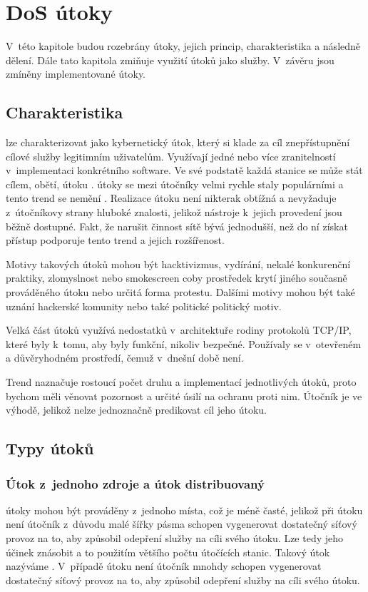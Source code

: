 \chapter[DoS útoky]{DoS útoky}
V~této kapitole budou rozebrány  útoky, jejich princip, charakteristika a následně
dělení. Dále tato kapitola zmiňuje využití  útoků jako služby. V~závěru jsou
zmíněny implementované útoky.

\section{Charakteristika}
 lze charakterizovat jako kybernetický útok, který si klade za cíl znepřístupnění
 cílové služby legitimním uživatelům. Využívají jedné nebo více zranitelností v~implementaci
 konkrétního software. Ve své podstatě každá stanice se může stát cílem, obětí, útoku
 .  útoky se mezi útočníky velmi rychle staly populárními a tento trend
 se nemění \cite{akamai_q2_2017}. Realizace  útoku není nikterak obtížná a
 nevyžaduje z~útočníkovy strany hluboké znalosti, jelikož nástroje k~jejich provedení jsou
 běžně dostupné. %
 Fakt, že narušit činnost sítě bývá
 jednodušší, než do ní získat přístup podporuje tento trend a jejich rozšířenost. 

Motivy takových útoků mohou být hacktivizmus, vydírání, nekalé konkurenční praktiky,
zlomyslnost nebo smokescreen coby prostředek krytí jiného současně prováděného útoku nebo
určitá forma protestu. Dalšími motivy mohou být také uznání hackerské komunity nebo také
politické politický motiv.

Velká část útoků využívá nedostatků v~architektuře rodiny protokolů TCP/IP, které byly k~tomu,
aby byly funkční, nikoliv bezpečné. Používaly se v~otevřeném a důvěryhodném prostředí, čemuž
v~dnešní době není.

Trend naznačuje rostoucí počet druhu a implementací jednotlivých útoků, proto bychom měli
věnovat pozornost a určité úsilí na ochranu proti nim. Útočník je ve výhodě, jelikož nelze
jednoznačně predikovat cíl jeho útoku.


\section{Typy útoků}
\subsection{Útok z~jednoho zdroje a útok distribuovaný}
\label{subs_ddos}
 útoky mohou být prováděny z~jednoho místa, což je méně časté, jelikož při
 útoku není útočník z~důvodu malé šířky pásma schopen vygenerovat dostatečný síťový
provoz na to, aby způsobil odepření služby na cíli svého útoku. Lze tedy jeho účinek znásobit
a to použitím většího počtu útočících stanic. Takový útok nazýváme .
V~případě  útoku není útočník mnohdy schopen vygenerovat dostatečný síťový provoz
na to, aby způsobil odepření služby na cíli svého útoku.

